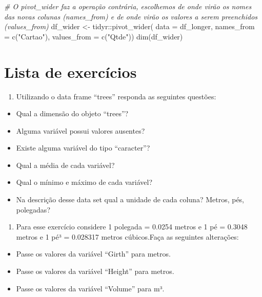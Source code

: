 \documentclass[
]{book}
\newenvironment{Shaded}{\begin{snugshade}}{\end{snugshade}}
\newcommand{\AttributeTok}[1]{\textcolor[rgb]{0.77,0.63,0.00}{#1}}
\newcommand{\CommentTok}[1]{\textcolor[rgb]{0.56,0.35,0.01}{\textit{#1}}}
\newcommand{\FunctionTok}[1]{\textcolor[rgb]{0.00,0.00,0.00}{#1}}
\newcommand{\NormalTok}[1]{#1}
\newcommand{\OtherTok}[1]{\textcolor[rgb]{0.56,0.35,0.01}{#1}}
\newcommand{\SpecialCharTok}[1]{\textcolor[rgb]{0.00,0.00,0.00}{#1}}
\newcommand{\StringTok}[1]{\textcolor[rgb]{0.31,0.60,0.02}{#1}}
\providecommand{\tightlist}{%
  \setlength{\itemsep}{0pt}\setlength{\parskip}{0pt}}
\begin{document}
\begin{Shaded}
\begin{Highlighting}[]
\CommentTok{\# O pivot\_wider faz a operação contrária, escolhemos de onde virão os nomes das novas colunas (names\_from) e de onde virão os valores a serem preenchidos (values\_from)}
\NormalTok{df\_wider }\OtherTok{\textless{}{-}}
\NormalTok{  tidyr}\SpecialCharTok{::}\FunctionTok{pivot\_wider}\NormalTok{(}
    \AttributeTok{data =}\NormalTok{ df\_longer,}
    \AttributeTok{names\_from =} \FunctionTok{c}\NormalTok{(}\StringTok{"Cartao"}\NormalTok{),}
    \AttributeTok{values\_from =} \FunctionTok{c}\NormalTok{(}\StringTok{"Qtde"}\NormalTok{))}
\FunctionTok{dim}\NormalTok{(df\_wider)}
\end{Highlighting}
\end{Shaded}

\hypertarget{lista-de-exercuxedcios-2}{%
\section{Lista de exercícios}\label{lista-de-exercuxedcios-2}}

\begin{enumerate}
\def\labelenumi{\arabic{enumi}.}
\tightlist
\item
  Utilizando o data frame ``trees'' responda as seguintes questões:
\end{enumerate}

\begin{itemize}
\tightlist
\item
  Qual a dimensão do objeto ``trees''?
\item
  Alguma variável possui valores ausentes?
\item
  Existe alguma variável do tipo ``caracter''?
\item
  Qual a média de cada variável?
\item
  Qual o mínimo e máximo de cada variável?
\item
  Na descrição desse data set qual a unidade de cada coluna? Metros, pés, polegadas?
\end{itemize}

\begin{enumerate}
\def\labelenumi{\arabic{enumi}.}
\setcounter{enumi}{1}
\tightlist
\item
  Para esse exercício considere 1 polegada = 0.0254 metros e 1 pé = 0.3048 metros e 1 pé³ = 0.028317 metros cúbicos.Faça as seguintes alterações:
\end{enumerate}

\begin{itemize}
\tightlist
\item
  Passe os valores da variável ``Girth'' para metros.
\item
  Passe os valores da variável ``Height'' para metros.
\item
  Passe os valores da variável ``Volume'' para m³.
\end{itemize}
\end{document}
